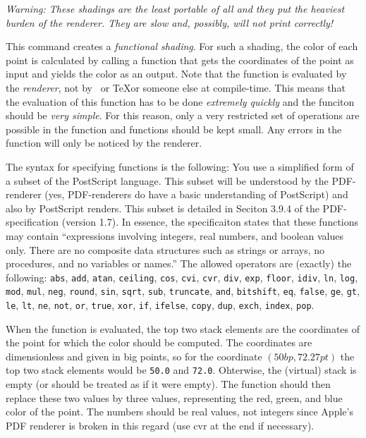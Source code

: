 \begin{command}{\pgfdeclarefunctionalshading{}}
  \emph{Warning: These shadings are the least portable of all and they
  put the heaviest burden of the renderer. They are slow and,
  possibly, will not print correctly!}

  This command creates a \emph{functional shading}. For such a
  shading, the color of each point is calculated by calling a function
  that gets the coordinates of the point as input and yields the
  color as an output. Note that the function is evaluated by the 
  \emph{renderer}, not by \pgfname\ or \TeX or someone else at
  compile-time. This means that the evaluation of this function has to
  be done \emph{extremely quickly} and the funciton should be
  \emph{very simple}. For this reason, only a very restricted set of
  operations are possible in the function and functions should be
  kept small. Any errors in the function will only be noticed by the
  renderer.

  The syntax for specifying functions is the following: You use a
  simplified form of a subset of the PostScript language. This subset
  will be understood by the PDF-renderer (yes, PDF-renderers do
  have a basic understanding of PostScript) and also by PostScript
  renders. This subset is detailed in Seciton 3.9.4 of the
  PDF-specification (version 1.7). In essence, the specificaiton
  states that these functions may contain ``expressions involving
  integers, real numbers, and boolean values only. There are no
  composite data structures such as strings or arrays, no procedures,
  and no variables or names.'' The allowed operators are (exactly) the
  following: \texttt{abs}, \texttt{add}, \texttt{atan},
  \texttt{ceiling}, \texttt{cos}, \texttt{cvi}, \texttt{cvr},
  \texttt{div}, \texttt{exp}, \texttt{floor}, \texttt{idiv},
  \texttt{ln}, \texttt{log}, \texttt{mod}, \texttt{mul}, \texttt{neg},
  \texttt{round}, \texttt{sin}, \texttt{sqrt}, \texttt{sub},
  \texttt{truncate}, \texttt{and}, \texttt{bitshift}, \texttt{eq},
  \texttt{false}, \texttt{ge}, \texttt{gt}, \texttt{le}, \texttt{lt},
  \texttt{ne}, \texttt{not}, \texttt{or}, \texttt{true}, \texttt{xor},
  \texttt{if}, \texttt{ifelse}, \texttt{copy}, \texttt{dup},
  \texttt{exch}, \texttt{index}, \texttt{pop}.

  When the function is evaluated, the top two stack elements are the
  coordinates of the point for which the color should be computed. The
  coordinates are dimensionless and given in big points, so for the
  coordinate $(50bp, 72.27pt)$ the top two stack elements would be
  \texttt{50.0} and \texttt{72.0}. Ohterwise, the (virtual) stack is
  empty (or should be treated as if it were empty). The function
  should then replace these two values by three values, representing
  the red, green, and blue color of the point. The numbers should be
  real values, not integers since Apple's PDF renderer is broken in
  this regard (use cvr at the end if necessary).


\end{command}
